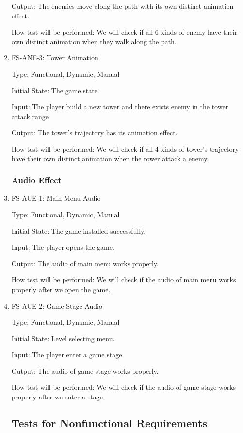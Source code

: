 \documentclass[12pt]{article}
\begin{document}
\begin{enumerate}
    Output: The enemies move along the path with its own distinct animation effect.
    
    How test will be performed: We will check if all 6 kinds of enemy have their own distinct animation when they walk along the path.
    
    \item{FS-ANE-3: Tower Animation}
    
    Type: Functional, Dynamic, Manual
    
    Initial State: The game state.
    
    Input: The player build a new tower and there exists enemy in the tower attack range
    
    Output: The tower's trajectory has its animation effect.
    
    How test will be performed: We will check if all 4 kinds of tower's trajectory have their own distinct animation when the tower attack a enemy.
    
	\subsubsection{Audio Effect}
	
					
	\item{FS-AUE-1: Main Menu Audio}
					
	Type: Functional, Dynamic, Manual
					
    Initial State: The game installed successfully.
					
	Input: The player opens the game. 
					
	Output: The audio of main menu works properly.
					
	How test will be performed: We will check if the audio of main menu works properly after we open the game.
	
	\item{FS-AUE-2: Game Stage Audio}
					
	Type: Functional, Dynamic, Manual
					
    Initial State: Level selecting menu.
					
	Input: The player enter a game stage.
					
	Output: The audio of game stage works properly.
					
	How test will be performed: We will check if the audio of game stage works properly after we enter a stage
					
					

    \subsection{Tests for Nonfunctional Requirements}


\end{enumerate}
\end{document}

